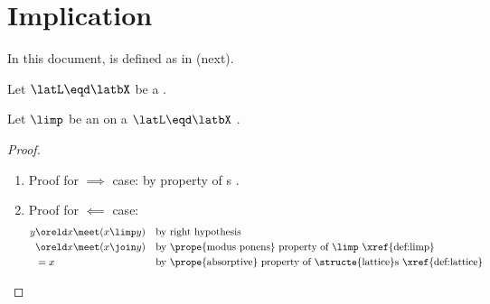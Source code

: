 
\chapter{Implication}
\label{chp:limp}
In this document,  is defined as in  (next).
\begin{definition}
\label{def:limp}
Let $\latL\eqd\latbX$ be a  .
\end{definition}

\begin{proposition}
\label{prop:limp_iff}
Let $\limp$ be an   on a  $\latL\eqd\latbX$ .
\end{proposition}
\begin{proof}
\begin{enumerate}
  \item Proof for $\implies$ case: by  property of s .
  \item Proof for $\impliedby$ case: 
    \begin{align*}
      y
        &\oreld x\meet(x\limp y)
        && \text{by right hypothesis}
      \\&\oreld x\meet(x\join y)
        && \text{by \prope{modus ponens} property of $\limp$ \xref{def:limp}}
      \\&= x
        && \text{by \prope{absorptive} property of \structe{lattice}s \xref{def:lattice}}
    \end{align*}
\end{enumerate}
\end{proof}


